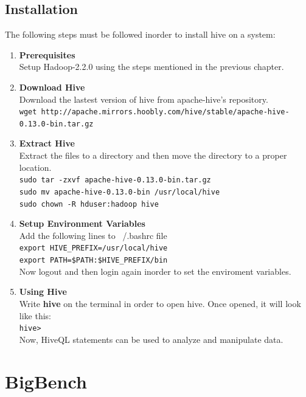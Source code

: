 \documentclass[12pt]{book}
\newcommand{\shellcmd}[1]{\\\indent\texttt{\footnotesize #1}\\}
\begin{document}
\section{Installation}
The following steps must be followed inorder to install hive on a system:
\begin{enumerate}
 \item \textbf{Prerequisites}
 \\\indent Setup Hadoop-2.2.0 using the steps mentioned in the previous chapter.
 \item \textbf{Download Hive}
 \\\indent Download the lastest version of hive from apache-hive's repository.
  \shellcmd{wget http://apache.mirrors.hoobly.com/hive/stable/apache-hive-0.13.0-bin.tar.gz}
 \item \textbf{Extract Hive}
 \\\indent Extract the files to a directory and then move the directory to a proper location.
 \shellcmd{sudo tar -zxvf apache-hive-0.13.0-bin.tar.gz\\\indent
  sudo mv apache-hive-0.13.0-bin /usr/local/hive\\\indent
  sudo chown -R hduser:hadoop hive
 }
 \item \textbf{Setup Environment Variables}
 \\\indent Add the following lines to ~/.bashrc file
 \shellcmd{export HIVE\_PREFIX=/usr/local/hive\\\indent
 export PATH=\$PATH:\$HIVE\_PREFIX/bin
 }Now logout and then login again inorder to set the enviroment variables.
 \item \textbf{Using Hive}
 \\\indent Write \textbf{hive} on the terminal in order to open hive. Once opened, it will look like this:
 \shellcmd{hive>}
 Now, HiveQL statements can be used to analyze and manipulate data.
\end{enumerate}




\chapter{BigBench}
\end{document}
